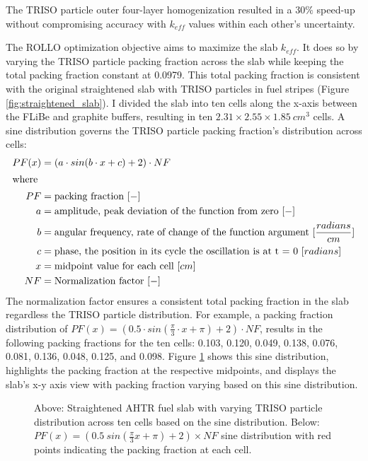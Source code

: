 The \gls{TRISO} particle outer four-layer homogenization resulted in a $30\%$ 
speed-up without compromising accuracy with $k_{eff}$ values within each 
other's uncertainty.

The \gls{ROLLO} optimization objective aims to maximize the slab $k_{eff}$. 
It does so by varying the \gls{TRISO} particle packing fraction across the slab
while keeping the total packing fraction constant at 0.0979. 
This total packing fraction is consistent with the original straightened slab with 
TRISO particles in fuel stripes (Figure \ref{fig:straightened_slab}). 
I divided the slab into ten cells along the x-axis between the \gls{FLiBe} and 
graphite buffers, resulting in ten $2.31 \times 2.55 \times 1.85\ cm^3$ cells. 
A sine distribution governs the \gls{TRISO} particle packing fraction's 
distribution across cells:
\begin{align}
    PF(x) &= \left(a\cdot sin(b\cdot x + c) + 2\right) \cdot NF\\
    \intertext{where}
    PF &= \mbox{packing fraction } [-] \nonumber \\ 
    a &= \mbox{amplitude, peak deviation of the function from zero } [-] \nonumber \\
    b &= \mbox{angular frequency, rate of change of the function argument } [\frac{radians}{cm}] \nonumber \\
    c &= \mbox{phase, the position in its cycle the oscillation is at t = 0 } [radians]\nonumber \\
    x &= \mbox{midpoint value for each cell } [cm]\nonumber \\
    NF &= \mbox{Normalization factor } [-]\nonumber
\end{align}
The normalization factor ensures a consistent total packing fraction 
in the slab regardless the \gls{TRISO} particle distribution.
For example, a packing fraction distribution of 
$PF(x) = \left(0.5\cdot sin(\frac{\pi}{3}\cdot x + \pi) + 2\right)  \cdot NF$, 
results in the following packing fractions for the ten cells: 0.103, 0.120, 
0.049, 0.138, 0.076, 0.081, 0.136, 0.048, 0.125, and 0.098. 
Figure \ref{fig:triso_distribution} shows this sine distribution, highlights 
the packing fraction at the respective midpoints, and displays the slab's x-y 
axis view with packing fraction varying based on this sine distribution. 
\begin{figure}[]
    \centering
    \caption{Above: Straightened \acrfull{AHTR} fuel slab with varying \gls{TRISO} particle 
    distribution across ten cells based on the sine distribution. 
    Below: $PF(x) = (0.5\ sin(\frac{\pi}{3}x + \pi) + 2)  \times NF$ 
    sine distribution with red points indicating the packing fraction at each cell. }
    \label{fig:triso_distribution}
\end{figure}

